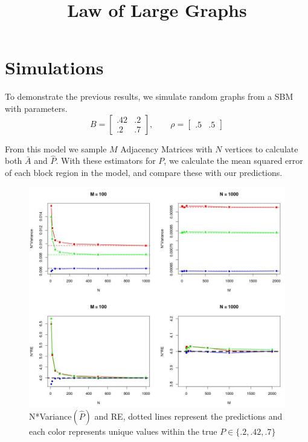 \documentclass[10pt]{article}
\title{Law of Large Graphs}
\author{}
\date{}
\begin{document}
	\large
	\maketitle
	\thispagestyle{headings}
	
	\vspace{-.5in}
	
	\section{Simulations}
	To demonstrate the previous results, we simulate random graphs from a SBM with parameters.
	\begin{equation*}
	B = \begin{bmatrix}
	.42 & .2 \\
	.2 & .7 
	\end{bmatrix}
	,\qquad \rho = \begin{bmatrix}
	.5 & .5
	\end{bmatrix}
	\end{equation*}
	
	From this model we sample $M$ Adjacency Matrices with $N$ vertices to calculate both $\bar{A}$ and $\hat{P}$.  With these estimators for $P$, we calculate the mean squared error of each block region in the model, and compare these with our predictions.
	
	\begin{figure}[!htb]
		\centering
		\includegraphics[width=16cm]{Var_RE.JPG}
		\caption{N*Variance$(\hat{P})$ and RE, dotted lines represent the predictions and each color represents unique values within the true $P \in \{.2,.42,.7\}$ }
		\label{fig:plot1}
	\end{figure}
	
\end{document}
